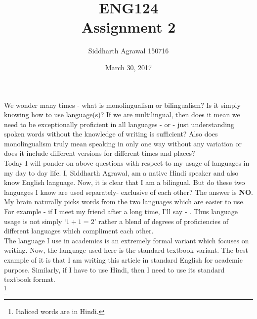 \documentclass[12pt,a4paper]{article}
\title{\textbf{ENG124\\Assignment 2}}
\author{Siddharth Agrawal 150716}
\date{March 30, 2017}
\newcommand\blfootnote[1]{%
  \begingroup
  \renewcommand\thefootnote{}\footnote{#1}%
  \addtocounter{footnote}{-1}%
  \endgroup
}
\begin{document}
\maketitle

We wonder many times - what is monolingualism or bilingualism? Is it simply knowing how to use language(s)? If we are multilingual, then does it mean we need to be exceptionally proficient in all languages - or - just understanding spoken words without the knowledge of writing is sufficient? Also does monolingualism truly mean speaking in only one way without any variation or does it include different versions for different times and places?
\\

Today I will ponder on above questions with respect to my usage of languages in my day to day life. I, Siddharth Agrawal, am a native Hindi speaker and also know English language. Now, it is clear that I am a bilingual. But do these two languages I know are used separately- exclusive of each other? The answer is \textbf{NO}. My brain naturally picks words from the two languages which are easier to use. For example - if I meet my friend after a long time, I'll say - . Thus language usage is not simply `$1+1=2$' rather a blend of degrees of proficiencies of different languages which compliment each other.
\\

The language I use in academics is an extremely formal variant which focuses on writing. Now, the language used here is the standard textbook variant. The best example of it is that I am writing this article in standard English for academic purpose. Similarly, if I have to use Hindi, then I need to use its standard textbook format.
\\
\blfootnote{Italiced words are in Hindi.}
\end{document}
